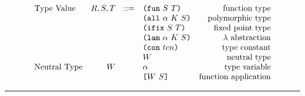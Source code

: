 \documentclass[../plutus-core-specification.tex]{subfiles}
\begin{document}
\begin{minipage}{\linewidth}
    \centering
    \[\begin{array}{lrclr}
        \textrm{Type Value}       & R,S,T  & ::= & \texttt{(} \texttt{fun} ~ S ~ T \texttt{)}                & \textrm{function type}\\
                                  &        &     & \texttt{(} \texttt{all} ~ \alpha ~ K ~ S \texttt{)}        & \textrm{polymorphic type}\\
                                  &        &     & \texttt{(} \texttt{ifix} ~ S ~ T \texttt{)}                & \textrm{fixed point type}\\
                                  &        &     & \texttt{(} \texttt{lam} ~ \alpha ~ K ~ S \texttt{)}        & \textrm{$\lambda$ abstraction}\\
                                  &        &     & \texttt{(} \texttt{con} ~ tcn \texttt{)}                 & \textrm{type constant}\\
                                  &        &     & W                          & \textrm{neutral type}\\
        \textrm{Neutral Type}     & W      &     & \alpha                     & \textrm{type variable}\\
                                  &        &     & \texttt{[} W ~ S \texttt{]}                & \textrm{function application}\\
    \end{array}\]
    \label{fig:grammar_algorithmic_restricted:type-values}
\end{minipage}

\medskip\hrule\bigskip
\end{document}
